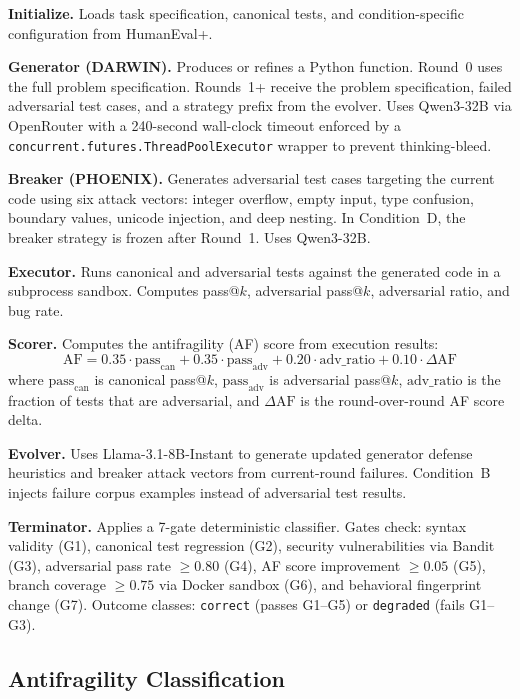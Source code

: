 \documentclass[11pt,letterpaper]{article}
\begin{document}
\textbf{Initialize.} Loads task specification, canonical tests, and
condition-specific configuration from HumanEval+.

\textbf{Generator (DARWIN).} Produces or refines a Python function. Round~0
uses the full problem specification. Rounds~1+ receive the problem
specification, failed adversarial test cases, and a strategy prefix from the
evolver. Uses Qwen3-32B via OpenRouter with a 240-second wall-clock timeout
enforced by a \texttt{concurrent.futures.ThreadPoolExecutor} wrapper to prevent
thinking-bleed.

\textbf{Breaker (PHOENIX).} Generates adversarial test cases targeting the
current code using six attack vectors: integer overflow, empty input, type
confusion, boundary values, unicode injection, and deep nesting. In Condition~D,
the breaker strategy is frozen after Round~1. Uses Qwen3-32B.

\textbf{Executor.} Runs canonical and adversarial tests against the generated
code in a subprocess sandbox. Computes pass@$k$, adversarial pass@$k$,
adversarial ratio, and bug rate.

\textbf{Scorer.} Computes the antifragility (AF) score from execution results:
\begin{equation}
  \text{AF} =
    0.35\cdot\text{pass}_{\text{can}}
    + 0.35\cdot\text{pass}_{\text{adv}}
    + 0.20\cdot\text{adv\_ratio}
    + 0.10\cdot\Delta\text{AF}
  \label{eq:af}
\end{equation}
where $\text{pass}_{\text{can}}$ is canonical pass@$k$,
$\text{pass}_{\text{adv}}$ is adversarial pass@$k$,
$\text{adv\_ratio}$ is the fraction of tests that are adversarial, and
$\Delta\text{AF}$ is the round-over-round AF score delta.

\textbf{Evolver.} Uses Llama-3.1-8B-Instant to generate updated generator
defense heuristics and breaker attack vectors from current-round failures.
Condition~B injects failure corpus examples instead of adversarial test results.

\textbf{Terminator.} Applies a 7-gate deterministic classifier. Gates check:
syntax validity (G1), canonical test regression (G2), security vulnerabilities
via Bandit (G3), adversarial pass rate $\geq 0.80$ (G4), AF score improvement
$\geq 0.05$ (G5), branch coverage $\geq 0.75$ via Docker sandbox (G6), and
behavioral fingerprint change (G7). Outcome classes: \texttt{correct}
(passes G1--G5) or \texttt{degraded} (fails G1--G3).

\subsection{Antifragility Classification}
\end{document}
